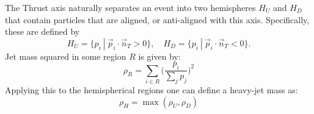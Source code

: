 The Thrust  axis naturally separates an event into two hemispheres $H_U$ and $H_D$ that contain particles that are aligned, or anti-aligned with this axis. Specifically, these are defined by
\begin{equation}
  H_U = \{p_i ~|~ \vec{p}_i \cdot \vec{n}_T > 0\},\quad
  H_D = \{p_i ~|~ \vec{p}_i \cdot \vec{n}_T < 0\}.
\end{equation}
Jet mass squared in some region $R$ is given by: 
\begin{equation}
  \rho_R = \sum_{i\in R} \Big(\frac{p_i}{\sum_j p_j}\Big)^2
\end{equation}
Applying this to the hemispherical regions one can define a heavy-jet mass as:
\begin{equation}
  \rho_H = \max(\rho_U,\rho_D)
  \label{eqn:heavyjetmass}
\end{equation}



